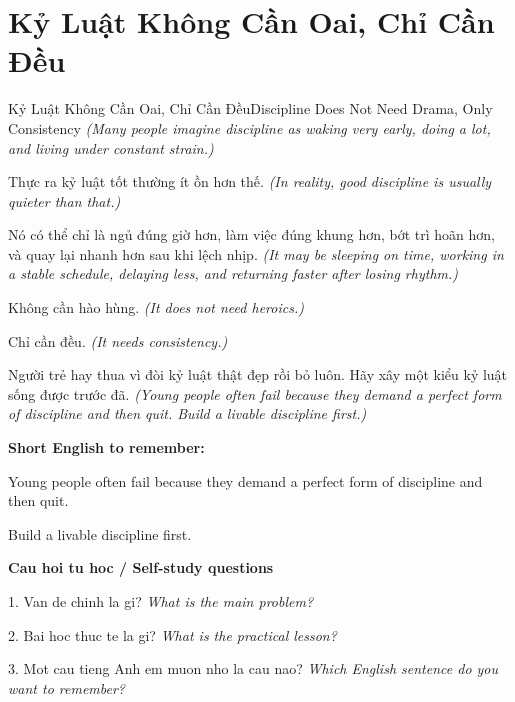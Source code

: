 \section{Kỷ Luật Không Cần Oai, Chỉ Cần Đều}
\begin{truyen}{Kỷ Luật Không Cần Oai, Chỉ Cần Đều}{Discipline Does Not Need Drama, Only Consistency}
\textit{(Many people imagine discipline as waking very early, doing a lot, and living under constant strain.)}

Thực ra kỷ luật tốt thường ít ồn hơn thế.
\textit{(In reality, good discipline is usually quieter than that.)}

Nó có thể chỉ là ngủ đúng giờ hơn, làm việc đúng khung hơn, bớt trì hoãn hơn, và quay lại nhanh hơn sau khi lệch nhịp.
\textit{(It may be sleeping on time, working in a stable schedule, delaying less, and returning faster after losing rhythm.)}

Không cần hào hùng.
\textit{(It does not need heroics.)}

Chỉ cần đều.
\textit{(It needs consistency.)}

\end{truyen}

\begin{baihoc}
Người trẻ hay thua vì đòi kỷ luật thật đẹp rồi bỏ luôn. Hãy xây một kiểu kỷ luật sống được trước đã.
\textit{(Young people often fail because they demand a perfect form of discipline and then quit. Build a livable discipline first.)}
\end{baihoc}

\begin{ghinhoanh}
\textbf{Short English to remember:}

Young people often fail because they demand a perfect form of discipline and then quit.

Build a livable discipline first.

\end{ghinhoanh}

\begin{tuhocnhanh}
\textbf{Cau hoi tu hoc / Self-study questions}

1. Van de chinh la gi? \textit{What is the main problem?}

2. Bai hoc thuc te la gi? \textit{What is the practical lesson?}

3. Mot cau tieng Anh em muon nho la cau nao? \textit{Which English sentence do you want to remember?}
\end{tuhocnhanh}
\ngancach

